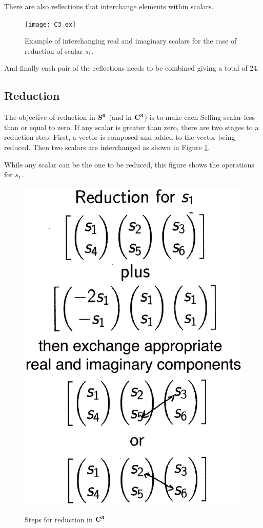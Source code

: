 \documentclass[preprint]{iucr}              %
\numberwithin{equation}{section}
\newcommand{\SVI}[0]{$\bf{S^{6}}$}
\newcommand{\CIII}[0]{$\bf{C^{3}}$}
\begin{document}
There are also reflections that interchange elements within 
scalars.
\begin{figure}
		\texttt{[image: C3\_ex]}
%
% 

	\caption{Example of interchanging real and imaginary scalars
	for the case of reduction of scalar $s_1$.}
	
\end{figure}



And finally each pair of the reflections needs to be combined
giving a total of 24.


\subsection{Reduction}
\label{reduction}

The objective of reduction in \SVI{} (and in \CIII{}) is to
make each Selling scalar less than or equal to zero.
If any scalar is greater than zero, there are two stages
to a reduction step. First,
a vector is composed and added to the vector being reduced.
Then two scalars are interchanged as shown in Figure \ref{S6_ops_B}.

While any scalar can be the one to be reduced, this figure shows
the operations for $s_1$.

\begin{figure}
	\includegraphics[height=0.65\textwidth]{S6_ops_C}
	\label{S6_ops_B}
	\caption{Steps for reduction in \CIII{}}
\end{figure}
\end{document}

